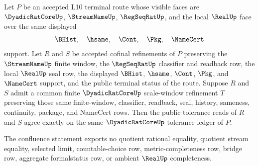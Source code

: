 \begin{theorem}
\label{thm:dyadicratcore-terminal-tolerance-common-refinement-confluence}
Let $P$ be an accepted L10 terminal route whose visible faces are $\DyadicRatCoreUp$, $\StreamNameUp$, $\RegSeqRatUp$, and the local $\RealUp$ face over the same displayed
$$
\BHist,\quad \hsame,\quad \Cont,\quad \Pkg,\quad \NameCert
$$
support. Let $R$ and $S$ be accepted cofinal refinements of $P$ preserving the $\StreamNameUp$ finite window, the $\RegSeqRatUp$ classifier and readback row, the local $\RealUp$ seal row, the displayed $\BHist$, $\hsame$, $\Cont$, $\Pkg$, and $\NameCert$ support, and the public terminal status of the route. Suppose $R$ and $S$ admit a common finite $\DyadicRatCoreUp$ scale-window refinement $T$ preserving those same finite-window, classifier, readback, seal, history, sameness, continuity, package, and NameCert rows. Then the public tolerance reads of $R$ and $S$ agree exactly on the same $\DyadicRatCoreUp$ tolerance ledger of $P$.

The confluence statement exports no quotient rational equality, quotient stream equality, selected limit, countable-choice row, metric-completeness row, bridge row, aggregate formalstatus row, or ambient $\RealUp$ completeness.
\end{theorem}
